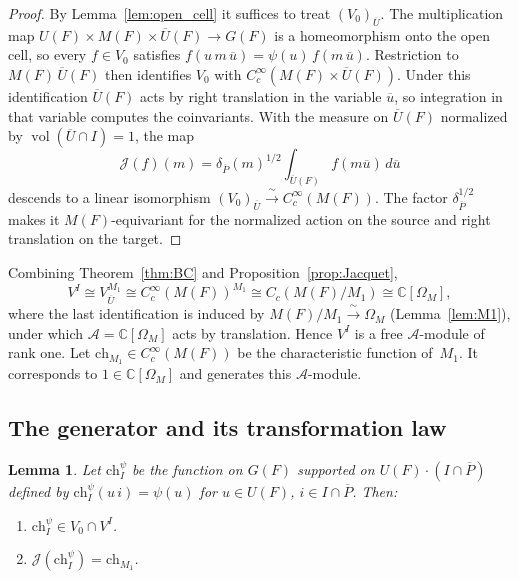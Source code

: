 \documentclass[11pt]{amsart}
\newtheorem{lemma}[theorem]{Lemma}
\theoremstyle{definition}
\theoremstyle{remark}
\DeclareMathOperator{\vol}{vol}
\newcommand{\CC}{\mathbb{C}}
\newcommand{\AAA}{\mathcal{A}}
\newcommand{\barr}[1]{\overline{#1}}
\begin{document}
\begin{proof}
By Lemma~\ref{lem:open_cell} it suffices to treat $(V_0)_{\barr{U}}$. The multiplication map $U(F)\times M(F)\times\barr{U}(F) \to G(F)$ is a homeomorphism onto the open cell, so every $f \in V_0$ satisfies $f(u\,m\,\barr{u}) = \psi(u)\,f(m\,\barr{u})$. Restriction to $M(F)\,\barr{U}(F)$ then identifies $V_0$ with $C_c^\infty(M(F)\times\barr{U}(F))$. Under this identification $\barr{U}(F)$ acts by right translation in the variable $\barr{u}$, so integration in that variable computes the coinvariants. With the measure on $\barr{U}(F)$ normalized by $\vol(\barr{U}\cap I) = 1$, the map
\[
\mathcal{J}(f)(m) = \delta_{\barr{P}}(m)^{1/2}\int_{\barr{U}(F)} f(m\barr{u})\,d\barr{u}
\]
descends to a linear isomorphism $(V_0)_{\barr{U}} \xrightarrow{\ \sim\ } C_c^\infty(M(F))$. The factor $\delta_{\barr{P}}^{1/2}$ makes it $M(F)$-equivariant for the normalized action on the source and right translation on the target.
\end{proof}

Combining Theorem~\ref{thm:BC} and Proposition~\ref{prop:Jacquet},
\[
V^I \cong V_{\barr{U}}^{M_1} \cong C_c^\infty(M(F))^{M_1}
\cong C_c(M(F)/M_1) \cong \CC[\Omega_M],
\]
where the last identification is induced by $M(F)/M_1 \xrightarrow{\ \sim\ } \Omega_M$ (Lemma~\ref{lem:M1}), under which $\AAA = \CC[\Omega_M]$ acts by translation. Hence $V^I$ is a free $\AAA$-module of rank one. Let $\mathrm{ch}_{M_1} \in C_c^\infty(M(F))$ be the characteristic function of~$M_1$. It corresponds to $1 \in \CC[\Omega_M]$ and generates this $\AAA$-module.


\subsection{The generator and its transformation law}\label{ssec:generator}

\begin{lemma}\label{lem:generator}
Let $\mathrm{ch}_I^\psi$ be the function on $G(F)$ supported on $U(F)\cdot(I\cap\barr{P})$ defined by $\mathrm{ch}_I^\psi(u\,i) = \psi(u)$ for $u \in U(F)$, $i \in I\cap\barr{P}$. Then:
\begin{enumerate}[\upshape(1)]
\item $\mathrm{ch}_I^\psi \in V_0 \cap V^I$.
\item $\mathcal{J}(\mathrm{ch}_I^\psi) = \mathrm{ch}_{M_1}$.
\end{enumerate}
\end{lemma}
\end{document}
